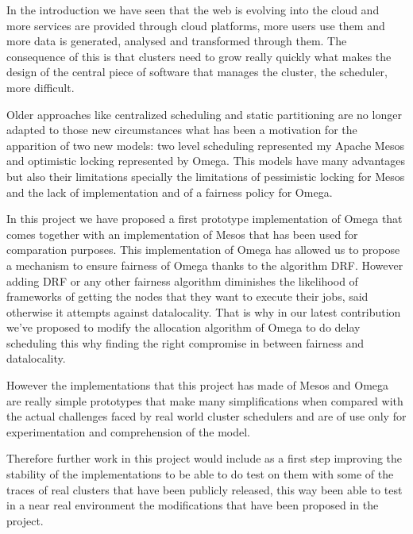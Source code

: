 \documentclass{report}                     %
\begin{document}

In the introduction we have seen that the web is evolving into the
cloud and more services are provided through cloud platforms, more
users use them and more data is generated, analysed and transformed
through them. The consequence of this is that clusters need to grow
really quickly what makes the design of the central piece of software
that manages the cluster, the scheduler, more difficult.


Older approaches like centralized scheduling and static partitioning
are no longer adapted to those new circumstances what has been a
motivation for the apparition of two new models: two level scheduling
represented my Apache Mesos and optimistic locking represented by
Omega. This models have many advantages but also their limitations
specially the limitations of pessimistic locking for Mesos and the
lack of implementation and of a fairness policy for Omega. 


In this project we have proposed a first prototype implementation of Omega that
comes together with an implementation of Mesos that has been used for
comparation purposes. This implementation of Omega has allowed us to
propose a mechanism to ensure fairness of Omega thanks to the
algorithm DRF. However adding DRF or any other fairness algorithm
diminishes the likelihood of frameworks of getting the nodes that they
want to execute their jobs, said otherwise it attempts against
datalocality. That is why in our latest contribution we've proposed to
modify the allocation algorithm of Omega to do delay scheduling this
why finding the right compromise in between fairness and datalocality.



However the implementations that this project has made of Mesos and
Omega are really simple prototypes that make many simplifications when
compared with the actual challenges faced by real world cluster
schedulers and are of use only for experimentation and comprehension
of the model. 

Therefore further work in this project would include as a first step
improving the stability of the implementations to be able to do test
on them with some of the traces of real clusters that have been
publicly released, this way been able to test in a near real
environment the modifications that have been proposed in the project.
\end{document}
